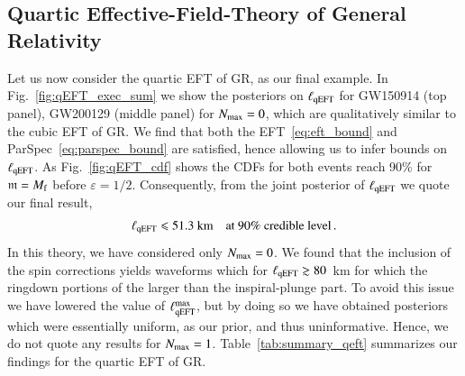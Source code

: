 \documentclass[twocolumn,
               prd,
               aps,
               superscriptaddress,
               tightenlines,
               nofootinbib,
               eqsecnum,
               amsfonts,
               amsmath,
               longbibliography]{revtex4-1}
\newcommand{\gm}{\mathfrak{m}}
\newcommand{\hs}[1]{{\textcolor{TealBlue}{{#1}}}}
\newcommand{\abcomm}[1]{{\textcolor{red}{{[AB: #1]}}}}
\begin{document}
\subsection{Quartic Effective-Field-Theory of General Relativity}
\label{sec:results_qeft}

Let us now consider the quartic EFT of GR, as our final example.
%
In Fig.~\ref{fig:qEFT_exec_sum} we show the posteriors on $\ell_{\rm qEFT}$ for GW150914 (top panel),
GW200129 (middle panel) for $N_{\rm max} = 0$, which are qualitatively similar to the cubic EFT of GR.
%
We find that both the EFT~\eqref{eq:eft_bound} and ParSpec~\eqref{eq:parspec_bound} are satisfied,
hence allowing us to infer bounds on $\ell_{\rm qEFT}$.
%
As Fig.~\ref{fig:qEFT_cdf} shows the CDFs for both events reach 90\% for $\gm = M_{\rm f}$ before $\varepsilon = 1/2$.
%
Consequently, from the joint posterior of $\ell_{\rm qEFT}$ we quote our final result,
%
\begin{equation}
    \ell_{\rm qEFT} \leqslant 51.3~\textrm{km} \quad \textrm{at 90\% credible level}\,.
\end{equation}
%
\hs{
In this theory, we have considered only $N_{\rm max} = 0$. We found that the
inclusion of the spin corrections yields waveforms which for $\ell_{\rm qEFT} \gtrsim 80$~km
for which the ringdown portions of the larger than the inspiral-plunge part.
%
To avoid this issue we have lowered the value of $\ell^{\rm max}_{\rm qEFT}$, but by doing so we have obtained posteriors
which were essentially uniform, as our prior, and thus uninformative. Hence, we do not quote any results for $N_{\rm max} = 1$.
}
%
Table~\ref{tab:summary_qeft} summarizes our findings for the quartic EFT of GR.
%
\end{document}
